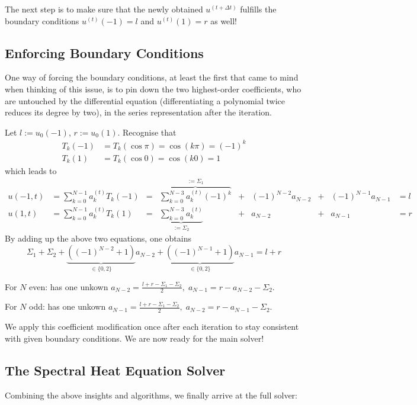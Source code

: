 \documentclass[12pt, a4paper]{article}
\begin{document}
  The next step is to make sure that the newly obtained $u^{(t+\Delta t)}$ fulfills the boundary conditions $u^{(t)}(-1) = l$ and $u^{(t)}(1) = r$ as well!

  \subsection{Enforcing Boundary Conditions}
  One way of forcing the boundary conditions, at least the first that came to mind when thinking of this issue, is to pin down the two highest-order coefficients, who are untouched by the differential equation (differentiating a polynomial twice reduces its degree by two), in the series representation after the iteration.

  Let $l := u_0(-1)$, $r := u_0(1)$.
  Recognise that
  \begin{align*}
    T_k(-1) & = T_k(\cos \pi) = \cos(k \pi) = (-1)^k \\
    T_k(1)  & = T_k(\cos 0) = \cos(k 0) = 1
  \end{align*}
  which leads to
  \begin{align*}
    u(-1, t) & = \sum_{k=0}^{N-1} a_k^{(t)} T_k(-1) & = & \overbrace{\sum_{k=0}^{N-3} a_k^{(t)} (-1)^k}^{:= \Sigma_1} & + & (-1)^{N-2} a_{N-2} & + & (-1)^{N-1} a_{N-1} & = l \\
    u(1, t)  & = \sum_{k=0}^{N-1} a_k^{(t)} T_k(1)  & = & \underbrace{\sum_{k=0}^{N-3} a_k^{(t)}}_{:= \Sigma_2}       & + & a_{N-2}            & + & a_{N-1}            & = r
  \end{align*}
  By adding up the above two equations, one obtains
  \begin{equation}
    \Sigma_1 + \Sigma_2 + \underbrace{\left((-1)^{N-2} + 1\right)}_{\in \{0, 2\}} a_{N-2} + \underbrace{\left((-1)^{N-1} + 1\right)}_{\in \{0, 2\}} a_{N-1} = l + r \label{eq:boundary-equation}
  \end{equation}

  For $N$ even:  has one unkown $a_{N-2} = \frac{l+r-\Sigma_1-\Sigma_2}{2},\; a_{N-1} = r - a_{N-2} - \Sigma_2$.

  For $N$ odd:  has one unkown $a_{N-1} = \frac{l+r-\Sigma_1-\Sigma_2}{2},\; a_{N-2} = r - a_{N-1} - \Sigma_2$.

  We apply this coefficient modification once after each iteration to stay consistent with given boundary conditions.
  We are now ready for the main solver!

  \subsection{The Spectral Heat Equation Solver}
  Combining the above insights and algorithms, we finally arrive at the full solver:
\end{document}
